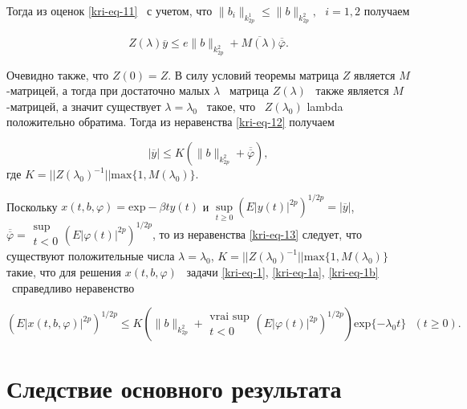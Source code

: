 Тогда из оценок \eqref{kri-eq-11} \ с учетом, что  $\|b_i\|_{k_{2p}^1}\le \|b\|_{k_{2p}^2},\text{  }i=1,2$ получаем

\begin{equation}\label{kri-eq-12}
	Z(\lambda
	)\overline y\le e\|b\|_{k_{2p}^2}+\overline{M(\lambda )}\overline{\overline{\varphi
	}}.
\end{equation}

Очевидно также, что  $Z(0)=Z$. В силу условий теоремы матрица  $Z$ является  $M$-\linebreak матрицей, а тогда при достаточно
малых  $\lambda $ \ матрица  $Z(\lambda )$ \ также является  $M${}-матрицей, а значит существует  $\lambda =\lambda _0$
\ такое, что \  $Z(\lambda _0)$ lambda положительно обратима. Тогда из неравенства \eqref{kri-eq-12} получаем

\begin{equation}\label{kri-eq-13}
	|\overline y|\le K(\|b\|_{k_{2p}^2}+\overline{\overline{\varphi
	}}),
\end{equation}
где  $K=||Z(\lambda _0)^{-1}||\text{max}\{1,M(\lambda _0)\}.$

Поскольку  $x(t,b,\varphi )=\text{exp}-\beta ty(t)$  и   $\underset{t\ge
0}\sup\left(E|y(t)|^{2p}\right)^{1/2p}=|\overline y|$,  $\overline{\overline{\varphi
}}=\begin{matrix}\sup\\t<0\end{matrix}\left(E|\varphi (t)|^{2p}\right)^{1/2p}$, то из неравенства \eqref{kri-eq-13} следует,
что существуют положительные числа  $\lambda =\lambda _0$, \linebreak  $K=||Z(\lambda _0)^{-1}||\text{max}\{1,M(\lambda _0)\}$
такие, что для решения  $x(t,b,\varphi )$ \ задачи \eqref{kri-eq-1}, \eqref{kri-eq-1a}, \eqref{kri-eq-1b} \ справедливо неравенство

\begin{equation*}
(E|x(t,b,\varphi )|^{2p})^{1/2p}\le
K\left(\|b\|_{k_{2p}^2}+\begin{matrix}\text{vrai sup}\\t<0\end{matrix}(E|\varphi
(t)|^{2p})^{1/2p}\right)\text{exp}\{-\lambda _0 t\}\text{  }(t\ge 0).
\end{equation*}

\section{Следствие основного результата}

